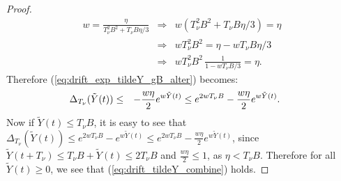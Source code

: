 \documentclass[journal]{IEEEtran}
\begin{document}
\begin{proof}
\begin{eqnarray*}
w=\frac{\eta}{T^2_{\nu}B^2+T_{\nu}B\eta/3} &\Rightarrow& w(T^2_{\nu}B^2+T_{\nu}B\eta/3)=\eta\\
&\Rightarrow& wT^2_{\nu}B^2=\eta-wT_{\nu}B\eta/3\\
&\Rightarrow& wT^2_{\nu}B^2\,\frac{1}{1-wT_{\nu}B/3}=\eta.
\end{eqnarray*}
Therefore (\ref{eq:drift_exp_tildeY_gB_alter}) becomes:
\begin{eqnarray}
\hspace{-.2in}\Delta_{T_{\nu}}(\tilde{Y}(t)) &\leq&-\frac{w\eta}{2}e^{w\tilde{Y}(t)}\leq e^{2wT_{\nu}B}-\frac{w\eta}{2}e^{w\tilde{Y}(t)}.
\end{eqnarray}
Now if $\tilde{Y}(t)\leq T_{\nu}B$, it is easy to see that $\Delta_{T_{\nu}}(\tilde{Y}(t))\leq e^{2wT_{\nu}B}-e^{w\tilde{Y}(t)}\leq e^{2wT_{\nu}B}-\frac{w\eta}{2}e^{w\tilde{Y}(t)}$, since $\tilde{Y}(t+T_{\nu})\leq T_{\nu}B+\tilde{Y}(t)\leq 2T_{\nu}B$ and $\frac{w\eta}{2}\leq1$, as $\eta<T_{\nu}B$. Therefore for all $\tilde{Y}(t)\geq0$, we see that (\ref{eq:drift_tildeY_combine}) holds.
\end{proof}
\end{document}
